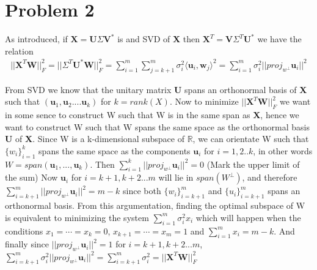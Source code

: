 \documentclass[a4paper,norsk]{article}
\begin{document}
\section*{Problem 2}
As introduced, if $\textbf{X} = \textbf{U} \Sigma \textbf{V}^*$ is and SVD of \textbf{X} then  $\textbf{X}^T = \textbf{V} \Sigma^T \textbf{U}^*$ we have the relation \newline
\begin{align*}
||\textbf{X}^T \textbf{W}||_F^2 = ||\Sigma^T \textbf{U}^* \textbf{W}||_F^2 = \sum_{i=1}^m \sum_{j=k+1}^m \sigma_i^2  \langle \textbf{u}_i , \textbf{w}_j\rangle^2 =
\sum_{i=1}^m \sigma_i^2 || proj_{w^{\perp}} \textbf{u}_i||^2 
\end{align*}

From SVD we know that the unitary matrix \textbf{U} spans an orthonormal basis of \textbf{X} such that $(\textbf{u}_1, \textbf{u}_2 .... \textbf{u}_k)$ for $k=rank(X)$. Now to minimize 
$||\textbf{X}^T \textbf{W}||_F^2$ we want in some sence to construct W such that W is in the same span as \textbf{X}, hence we want to construct W such that W spans the same space as the
orthonormal basis \textbf{U} of \textbf{X}. \newline \newline
Since W is a k-dimensional subspace of $\mathbb{R}$, we can orientate W such that $\{w_i\}_{i=1}^{k}$ spans the same space as the components $\textbf{u}_i$ for $i=1,2..k$, in other words
$W = span(\textbf{u}_1, ..., \textbf{u}_k )$. \newline
Then $\sum_{i=1}^k || proj_{w^{\perp}} \textbf{u}_i||^2 = 0$ (Mark the upper limit of the sum) \newline
Now $\textbf{u}_i$ for $i=k+1, k+2...m$ will lie in $span(W^\perp)$, and therefore $\sum_{i=k+1}^m || proj_{w^{\perp}} \textbf{u}_i||^2 = m-k$ since both  $\{w_i\}_{i=k+1}^{m}$ and
 $\{u_i\}_{i=k+1}^{m}$ spans an orthonormal basis. \newline \newline
From this argumentation, finding the optimal subspace of W is equivalent to minimizing the system $\sum_{i=1}^m \sigma_i^2 x_i$ which will happen when the conditions
$x_1 = \cdots = x_k = 0$, \hspace{2mm} $x_{k+1} = \cdots = x_m = 1 $ and $\sum_{i=1}^m x_i = m - k$. \newline \newline
And finally since $|| proj_{w^{\perp}} \textbf{u}_i||^2 = 1$ for $i=k+1, k+2...m$, \newline \newline
$\sum_{i=k+1}^m \sigma_i^2 || proj_{w^{\perp}} \textbf{u}_i||^2 = \sum_{i=k+1}^m \sigma_i^2 = ||\textbf{X}^T \textbf{W}||_F^2$
\end{document}
